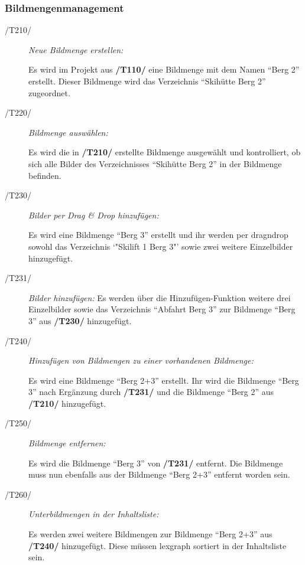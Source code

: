 	\subsubsection{Bildmengenmanagement}
		
		\begin{description}
		
			\item[/T210/] \textit{Neue Bildmenge erstellen:}\par Es wird im Projekt aus \textbf{/T110/} eine Bildmenge mit dem Namen "`Berg 2"' erstellt. Dieser Bildmenge wird das Verzeichnis "`Skihütte Berg 2"' zugeordnet.
				
			\item[/T220/] \textit{Bildmenge auswählen:}\par Es wird die in \textbf{/T210/} erstellte Bildmenge ausgewählt und kontrolliert, ob sich alle Bilder des Verzeichnisses "`Skihütte Berg 2"' in der Bildmenge befinden.

			\item[/T230/] \textit{Bilder per Drag \& Drop hinzufügen:}\par Es wird eine Bildmenge "`Berg 3"' erstellt und ihr werden per \gls{dragndrop} sowohl das Verzeichnis `"Skilift 1 Berg 3"' sowie zwei weitere Einzelbilder hinzugefügt.
			
			\item[/T231/] \textit{Bilder hinzufügen:} Es werden über die Hinzufügen-Funktion weitere drei Einzelbilder sowie das Verzeichnis "`Abfahrt Berg 3"' zur Bildmenge "`Berg 3"' aus \textbf{/T230/} hinzugefügt.
			
			\item[/T240/] \textit{Hinzufügen von Bildmengen zu einer vorhandenen Bildmenge:}\par Es wird eine Bildmenge "`Berg 2+3"' erstellt. Ihr wird die Bildmenge "`Berg 3"' nach Ergänzung durch \textbf{/T231/} und die Bildmenge "`Berg 2"' aus \textbf{/T210/} hinzugefügt.
				
			\item[/T250/] \textit{Bildmenge entfernen:}\par Es wird die Bildmenge "`Berg 3"' von \textbf{/T231/} entfernt. Die Bildmenge muss nun ebenfalls aus der Bildmenge "`Berg 2+3"' entfernt worden sein.
			
			\item[/T260/] \textit{Unterbildmengen in der Inhaltsliste:}\par Es werden zwei weitere Bildmengen zur Bildmenge "`Berg 2+3"' aus \textbf{/T240/} hinzugefügt. Diese müssen \gls{lexgraph} sortiert in der Inhaltsliste sein.
			

\end{description}
